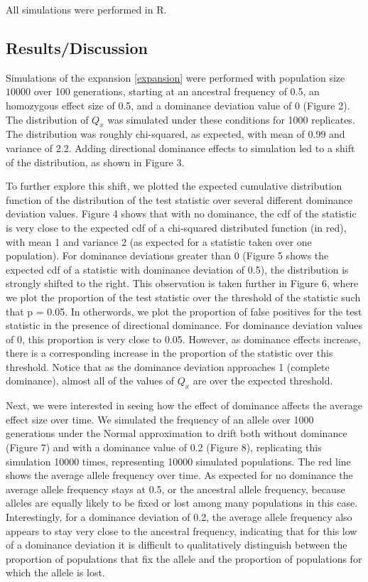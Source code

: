 \documentclass[a4paper,12pt]{article}
\begin{document}
All simulations were performed in R. 

\subsection*{Results/Discussion}
Simulations of the expansion \eqref{expansion} were performed with
population size $10000$ over 100 generations, starting at an ancestral
frequency of 0.5, an homozygous effect size of 0.5, and a dominance
deviation value of 0 (Figure 2). The distribution of $Q_x$ was simulated under
these conditions for 1000 replicates. The distribution was roughly
chi-squared, as expected, with mean of 0.99 and variance of
2.2. Adding directional dominance effects to simulation led to a shift of the
distribution, as shown in Figure 3.

To further explore this shift, we plotted the expected cumulative
distribution function of the distribution of the test statistic over
several different dominance deviation values. Figure 4 shows that with
no dominance, the cdf of the statistic is very close to the expected
cdf of a chi-squared distributed function (in red), with mean 1 and variance 2
(as expected for a statistic taken over one population). For dominance
deviations greater than 0 (Figure 5 shows the expected cdf of a
statistic with dominance deviation of 0.5), the distribution is
strongly shifted to the right. This observation is taken further in
Figure 6, where we plot the proportion of the test statistic over the
threshold of the statistic such that p = 0.05. In otherwords, we plot the
proportion of false positives for the test statistic in the presence
of directional dominance. For dominance deviation
values of 0, this proportion is very close to 0.05. However, as
dominance effects increase, there is a corresponding increase in the
proportion of the statistic over this threshold. Notice that as the
dominance deviation approaches 1 (complete dominance), almost all of
the values of $Q_x$ are  over the expected threshold.

Next, we were interested in seeing how the effect of dominance affects
the average effect size over time. We simulated the frequency of an
allele over 1000 generations under the Normal approximation to drift
both without dominance (Figure 7) and with a dominance value of 0.2
(Figure 8), replicating this simulation 10000 times, representing 10000
simulated populations. The red line shows the average allele frequency
over time. As expected for no dominance the average allele frequency
stays at 0.5, or the ancestral allele frequency, because alleles
are equally likely to be fixed or lost among many populations in this
case. Interestingly, for a dominance deviation of 0.2, the average allele
frequency also appears to stay very close to the ancestral frequency,
indicating that for this low of a dominance deviation it is difficult
to qualitatively distinguish between the proportion of populations
that fix the allele and the proportion of populations for which the
allele is lost.
\end{document}
